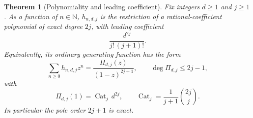\documentclass[11pt]{article}
\numberwithin{equation}{section}
\newtheorem{theorem}{Theorem}[section]
\theoremstyle{definition}
\newcommand{\N}{\mathbb N}
\newcommand{\Cat}{\operatorname{Cat}}
\begin{document}
\begin{theorem}[Polynomiality and leading coefficient]
\label{thm:fixed}
Fix integers $d\geq1$ and $j\geq1$. As a function of $n\in\N$, $h_{n,d,j}$ is
the restriction of a rational-coefficient polynomial of exact degree $2j$,
with leading coefficient
\begin{equation}
 \boxed{\displaystyle\frac{d^{2j}}{j!\,(j+1)!}.}
 \label{eq:leadingfixed}
\end{equation}
Equivalently, its ordinary generating function has the form
\begin{equation}
 \sum_{n\geq0}h_{n,d,j}z^n=\frac{\Pi_{d,j}(z)}{(1-z)^{2j+1}},
 \qquad\deg\Pi_{d,j}\leq2j-1,
 \label{eq:fixedrational}
\end{equation}
with
\begin{equation}
 \Pi_{d,j}(1)=\Cat_j\,d^{2j},\qquad
 \Cat_j=\frac1{j+1}\binom{2j}{j}.
 \label{eq:Pboundary}
\end{equation}
In particular the pole order $2j+1$ is exact.
\end{theorem}
\end{document}
